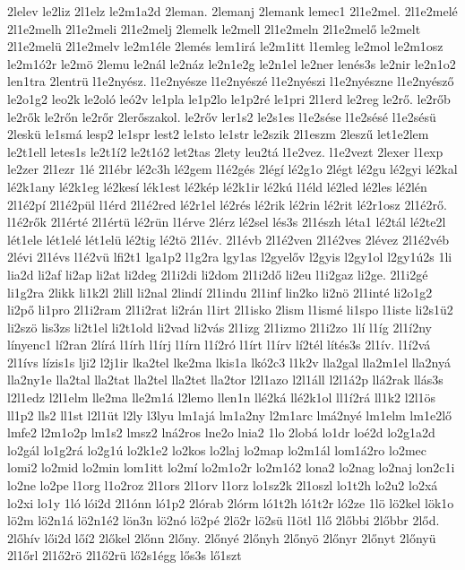 {2lelev
le2liz
2l1elz
le2m1a2d
2leman.
2lemanj
2lemank
lemec1
2l1e2mel.
2l1e2melé
2l1e2melh
2l1e2meli
2l1e2melj
2lemelk
le2mell
2l1e2meln
2l1e2melő
le2melt
2l1e2melü
2l1e2melv
le2m1éle
2lemés
lem1irá
le2m1itt
l1emleg
le2mol
le2m1osz
le2m1ó2r
le2mö
2lemu
le2nál
le2náz
le2n1e2g
le2n1el
le2ner
lenés3s
le2nir
le2n1o2
len1tra
2lentrü
l1e2nyész.
l1e2nyésze
l1e2nyészé
l1e2nyészi
l1e2nyészne
l1e2nyésző
le2o1g2
leo2k
le2oló
leó2v
le1pla
le1p2lo
le1p2ré
le1pri
2l1erd
le2reg
le2rő.
le2rőb
le2rők
le2rőn
le2rőr
2lerőszakol.
le2rőv
ler1s2
le2s1es
l1e2sése
l1e2sésé
l1e2sésü
2leskü
le1smá
lesp2
le1spr
lest2
le1sto
le1str
le2szik
2l1eszm
2leszű
let1e2lem
le2t1ell
letes1s
le2t1í2
le2t1ó2
let2tas
2lety
leu2tá
l1e2vez.
l1e2vezt
2lexer
l1exp
le2zer
2l1ezr
1lé
2l1ébr
lé2c3h
lé2gem
l1é2gés
2légí
lé2g1o
2légt
lé2gu
lé2gyi
lé2kal
lé2k1any
lé2k1eg
lé2kesí
lék1est
lé2kép
lé2k1ir
lé2kú
l1éld
lé2led
lé2les
lé2lén
2l1é2pí
2l1é2pül
l1érd
2l1é2red
lé2r1el
lé2rés
lé2rik
lé2rin
lé2rit
lé2r1osz
2l1é2rő.
l1é2rők
2l1érté
2l1értü
lé2rün
l1érve
2lérz
lé2sel
lés3s
2l1észh
léta1
lé2tál
lé2te2l
lét1ele
lét1elé
lét1elü
lé2tig
lé2tö
2l1év.
2l1évb
2l1é2ven
2l1é2ves
2lévez
2l1é2véb
2lévi
2l1évs
l1é2vü
lfi2t1
lga1p2
l1g2ra
lgy1as
l2gyelőv
l2gyis
l2gy1ol
l2gy1ú2s
1li
lia2d
li2af
li2ap
li2at
li2deg
2l1i2di
li2dom
2l1i2dő
li2eu
l1i2gaz
li2ge.
2l1i2gé
li1g2ra
2likk
li1k2l
2lill
li2nal
2lindí
2l1indu
2l1inf
lin2ko
li2nö
2l1inté
li2o1g2
li2pő
li1pro
2l1i2ram
2l1i2rat
li2rán
l1irt
2l1isko
2lism
l1ismé
li1spo
l1iste
li2s1ü2
li2szö
lis3zs
li2t1el
li2t1old
li2vad
li2vás
2l1izg
2l1izmo
2l1i2zo
1lí
l1íg
2l1í2ny
línyenc1
lí2ran
2lírá
l1írh
l1írj
l1írn
l1í2ró
l1írt
l1írv
lí2tél
lítés3s
2l1ív.
l1í2vá
2l1ívs
lízis1s
lji2
l2j1ir
lka2tel
lke2ma
lkis1a
lkó2c3
l1k2v
lla2gal
lla2m1el
lla2nyá
lla2ny1e
lla2tal
lla2tat
lla2tel
lla2tet
lla2tor
l2l1azo
l2l1áll
l2l1á2p
llá2rak
llás3s
l2l1edz
l2l1elm
lle2ma
lle2m1á
l2lemo
llen1n
llé2ká
llé2k1ol
ll1í2rá
ll1k2
l2l1ös
ll1p2
lls2
ll1st
l2l1üt
l2ly
l3lyu
lm1ajá
lm1a2ny
l2m1arc
lmá2nyé
lm1elm
lm1e2lő
lmfe2
l2m1o2p
lm1s2
lmsz2
lná2ros
lne2o
lnia2
1lo
2lobá
lo1dr
loé2d
lo2g1a2d
lo2gál
lo1g2rá
lo2g1ú
lo2k1e2
lo2kos
lo2laj
lo2map
lo2m1ál
lom1á2ro
lo2mec
lomi2
lo2mid
lo2min
lom1itt
lo2mí
lo2m1o2r
lo2m1ó2
lona2
lo2nag
lo2naj
lon2c1i
lo2ne
lo2pe
l1org
l1o2roz
2l1ors
2l1orv
l1orz
lo1sz2k
2l1oszl
lo1t2h
lo2u2
lo2xá
lo2xi
lo1y
1ló
lói2d
2l1ónn
ló1p2
2lórab
2lórm
ló1t2h
ló1t2r
ló2ze
1lö
lö2kel
lök1o
lö2m
lö2n1á
lö2n1é2
lön3n
lö2nó
lö2pé
2lö2r
lö2sü
l1ötl
1lő
2lőbbi
2lőbbr
2lőd.
2lőhív
lői2d
lőí2
2lőkel
2lőnn
2lőny.
2lőnyé
2lőnyh
2lőnyö
2lőnyr
2lőnyt
2lőnyü
2l1őrl
2l1ő2rö
2l1ő2rü
lő2s1égg
lős3s
lő1szt
}
